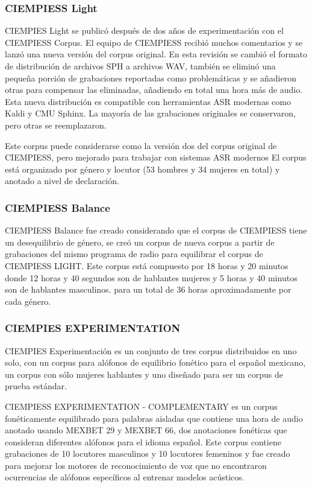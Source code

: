 \subsubsection{CIEMPIESS Light}

CIEMPIES Light \cite{CIEMPIESS-LIGHT} se publicó después de dos años de experimentación con el CIEMPIESS Corpus. El equipo de CIEMPIESS recibió muchos comentarios y se lanzó una nueva versión del corpus original. En esta revisión se cambió el formato de distribución de archivos SPH a archivos WAV, también se eliminó una pequeña porción de grabaciones reportadas como problemáticas y se añadieron otras para compensar las eliminadas, añadiendo en total una hora m\'as de audio. Esta nueva distribución es compatible con herramientas ASR modernas como Kaldi y CMU Sphinx. La mayoría de las grabaciones originales se conservaron, pero otras se reemplazaron. 

Este corpus puede considerarse como la versión dos del corpus original de CIEMPIESS, pero mejorado para trabajar con sistemas ASR modernos El corpus está organizado por género y locutor (53 hombres y 34 mujeres en total) y anotado a nivel de declaración. 

\subsubsection{CIEMPIESS Balance}

CIEMPIESS Balance \cite{CIEMPIESS-BALANCE} fue creado considerando que el corpus de CIEMPIESS tiene un desequilibrio de género, se creó un corpus de nueva corpus a partir de grabaciones del mismo programa de radio para equilibrar el corpus de CIEMPIESS LIGHT. Este corpus está compuesto por 18 horas y 20 minutos donde 12 horas y 40 segundos son de hablantes mujeres y 5 horas y 40 minutos son de hablantes masculinos. para un total de 36 horas aproximadamente por cada género.


\subsubsection{CIEMPIES EXPERIMENTATION}

CIEMPIES Experimentación \cite{CIEMPIESS-Experimentation} es un conjunto de tres corpus distribuidos en uno solo, con un corpus para alófonos de equilibrio fonético para el español mexicano, un corpus con s\'olo mujeres hablantes y uno diseñado para ser un corpus de prueba estándar.

CIEMPIESS EXPERIMENTATION - COMPLEMENTARY es un corpus fonéticamente equilibrado para palabras aisladas que contiene una hora de audio anotado usando MEXBET 29 y MEXBET 66, dos anotaciones fonéticas que consideran diferentes alófonos para el idioma español. Este corpus contiene grabaciones de 10 locutores masculinos y 10 locutores femeninos y fue creado para mejorar los motores de reconocimiento de voz que no encontraron ocurrencias de alófonos específicos al entrenar modelos acústicos.

